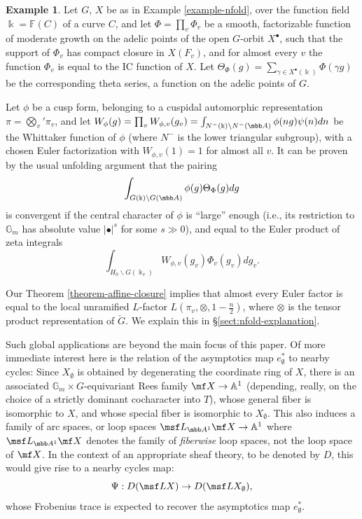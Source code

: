 \documentclass[final]{amsart}
\theoremstyle{remark}
\theoremstyle{definition}
\newtheorem{eg}[subsubsection]{Example}
\numberwithin{equation}{section}
\begin{document}
\begin{eg}\label{example-nfold-global}
 Let $G$, $X$ be as in Example \ref{example-nfold}, over the function field $\Bbbk = \mathbb F(C)$ of a curve $C$, and let $\Phi = \prod_v \Phi_v$ be a smooth, factorizable function of moderate growth on the adelic points of the open $G$-orbit $X^\bullet$, such that the support of $\Phi_v$ has compact closure in $X(F_v)$, and for almost every $v$ the function $\Phi_v$ is equal to the IC function of $X$. Let $\Theta_\Phi(g) = \sum_{\gamma\in X^\bullet(\Bbbk)} \Phi(\gamma g)$ be the corresponding theta series, a function on the adelic points of $G$. 
 
 Let $\phi$ be a cusp form, belonging to a cuspidal automorphic representation $\pi =  \bigotimes_v' \pi_v$, and let $W_\phi(g) = \prod_v W_{\phi, v}(g_v) = \int_{N^-(\Bbbk)\backslash N^-(\mbb A)} \phi(ng) \psi(n) dn$ be the Whittaker function of $\phi$ (where $N^-$ is the lower triangular subgroup), with a chosen Euler factorization with $W_{\phi,v}(1)=1$ for almost all $v$. It can be proven by the usual unfolding argument that the pairing
 \[ \int_{G(\Bbbk)\backslash G(\mbb A)} \phi(g) \Theta_\Phi(g) dg\]
 is convergent if the central character of $\phi$ is ``large'' enough (i.e., its restriction to $\mathbb G_m$ has absolute value $|\bullet|^s$ for some $s \gg 0$), and equal to the Euler product of zeta integrals 
 \[ \int_{H_0\backslash G (\Bbbk_v)} W_{\phi,v}(g_v) \Phi_v(g_v) dg_v.\]
 
 Our Theorem \ref{theorem-affine-closure} implies that almost every Euler factor is equal to the local unramified $L$-factor $L(\pi_v, \otimes, 1 - \frac{n}{2})$, where $\otimes$ is the tensor product representation of $\check G$.  We explain this in \S \ref{sect:nfold-explanation}. 
\end{eg}







\medskip

Such global applications are beyond the main focus of this paper. Of more immediate interest here is the relation of the asymptotics map $e_\emptyset^*$ to nearby cycles: Since $X_\emptyset$ is obtained by degenerating the coordinate ring of $X$, there is an associated $\mathbb G_m\times G$-equivariant Rees family $\mf X\to \mathbb A^1$ (depending, really, on the choice of a strictly dominant cocharacter into $T$), whose general fiber is isomorphic to $X$, and whose special fiber is isomorphic to $X_\emptyset$. This also induces a family of arc spaces, or loop spaces $\msf L_{\mbb A^1}\mf X\to \mathbb A^1$ where $\msf L_{\mbb A^1}\mf X$ denotes the family of \emph{fiberwise} loop spaces, not the loop space of $\mf X$. In the context of an appropriate sheaf theory, to be denoted by $D$, this would give rise to a nearby cycles map:
\[ \Psi: D(\msf LX) \to D(\msf LX_\emptyset),\]
whose Frobenius trace is expected to recover the asymptotics map $e_\emptyset^*$. 
\end{document}
